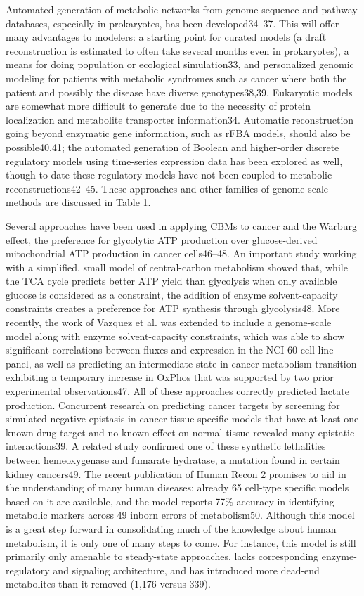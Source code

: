\documentclass[phd,tocprelim]{cornell}
\theoremstyle{break}
\theoremstyle{empty}
\begin{document}
Automated generation of metabolic networks from genome sequence and
pathway databases, especially in prokaryotes, has been developed34–37.
This will offer many advantages to modelers: a starting point for
curated models (a draft reconstruction is estimated to often take
several months even in prokaryotes), a means for doing population or
ecological simulation33, and personalized genomic modeling for
patients with metabolic syndromes such as cancer where both the
patient and possibly the disease have diverse genotypes38,39.
Eukaryotic models are somewhat more difficult to generate due to the
necessity of protein localization and metabolite transporter
information34. Automatic reconstruction going beyond enzymatic gene
information, such as rFBA models, should also be possible40,41; the
automated generation of Boolean and higher-order discrete regulatory
models using time-series expression data has been explored as well,
though to date these regulatory models have not been coupled to
metabolic reconstructions42–45. These approaches and other families of
genome-scale methods are discussed in Table 1.

Several approaches have been used in applying CBMs to cancer and the
Warburg effect, the preference for glycolytic ATP production over
glucose-derived mitochondrial ATP production in cancer cells46–48. An
important study working with a simplified, small model of
central-carbon metabolism showed that, while the TCA cycle predicts
better ATP yield than glycolysis when only available glucose is
considered as a constraint, the addition of enzyme solvent-capacity
constraints creates a preference for ATP synthesis through
glycolysis48. More recently, the work of Vazquez et al. was extended
to include a genome-scale model along with enzyme solvent-capacity
constraints, which was able to show significant correlations between
fluxes and expression in the NCI-60 cell line panel, as well as
predicting an intermediate state in cancer metabolism transition
exhibiting a temporary increase in OxPhos that was supported by two
prior experimental observations47. All of these approaches correctly
predicted lactate production. Concurrent research on predicting cancer
targets by screening for simulated negative epistasis in cancer
tissue-specific models that have at least one known-drug target and no
known effect on normal tissue revealed many epistatic
interactions39. A related study confirmed one of these synthetic
lethalities between hemeoxygenase and fumarate hydratase, a mutation
found in certain kidney cancers49. The recent publication of Human
Recon 2 promises to aid in the understanding of many human diseases;
already 65 cell-type specific models based on it are available, and
the model reports 77\% accuracy in identifying metabolic markers
across 49 inborn errors of metabolism50. Although this model is a
great step forward in consolidating much of the knowledge about human
metabolism, it is only one of many steps to come. For instance, this
model is still primarily only amenable to steady-state approaches,
lacks corresponding enzyme-regulatory and signaling architecture, and
has introduced more dead-end metabolites than it removed (1,176 versus
339). 
\end{document}
